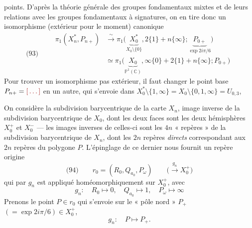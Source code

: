 \documentclass[11pt,a4paper]{article}
\begin{document}
points. D'après la théorie générale des groupes fondamentaux mixtes et de leurs relations avec les groupes fondamentaux à signatures, on en tire donc un isomorphisme (extérieur pour le moment) canonique
\[
  \text{(93)}\qquad
  \begin{aligned}
    \pi_1(X_n^*, P_{n+}) &\xrightarrow{\ \sim\ } \pi_1\bigl(\underbrace{X_0^*}_{X_0 \setminus \{0\}}, 2\{1\} + n\{\infty\} ; \underbrace{P_{0+}}_{\exp 2i\pi/6}\bigr) \\
    &\simeq \pi_1\bigl(\underbrace{X_0}_{\mathbb{P}^1(\mathbb{C})}, \infty\{0\} + 2\{1\} + n\{\infty\} ; P_{0+}\bigr)
  \end{aligned}
\]
Pour trouver un isomorphisme pas extérieur, il faut changer le point base $P_{n+} = \ill{}$ en un autre, qui s'envoie dans \struck{\ill{}} $X_0^* \setminus \{1,\infty\} = X_0 \setminus \{0,1,\infty\} = U_{0,3}$,


On considère la subdivision barycentrique de la carte $X_n$, image inverse de la subdivision barycentrique de $X_0$, dont les deux faces sont les deux hémisphères $X_0^+$ et $X_0^-$ — les images inverses de celles-ci sont les $4n$ « repères »  de la subdivision barycentrique de $X_n$, dont les $2n$ repères \emph{directs}  correspondant aux $2n$ repères du polygone $P$. L'épinglage de ce dernier nous fournit un repère origine
\[
  \text{(94)}\qquad r_0 = (R_0, Q_{a_0}, P_\omega) \qquad \bigl(\xrightarrow{\ g_n\ } X_0^+\bigr)
\]
qui par $g_n$ est appliqué homéomorphiquement sur $X_0^+$, avec 
\[
  g_n : \quad R_0 \longmapsto 0, \quad Q_{a_0} \longmapsto 1, \quad P_\omega \longmapsto \infty
\]
Prenons le point $P \in r_0$ qui s'envoie sur le « pôle nord » $P_+$ $(= \exp 2i\pi/6) \in X_0^+$,
\[
  g_n : \quad P \longmapsto P_+ .
\]
\end{document}
